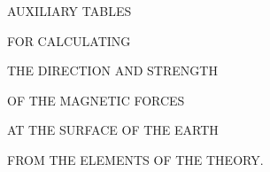\clearpage
\thispagestyle{empty}
\begin{center}
\vspace*{1in}
{\Large AUXILIARY TABLES\par}
\bigskip
FOR CALCULATING\par
\bigskip
{\large THE DIRECTION AND STRENGTH\par}
\bigskip
OF THE MAGNETIC FORCES\par
\bigskip
AT THE SURFACE OF THE EARTH\par
\bigskip
FROM THE ELEMENTS OF THE THEORY.\par
\end{center}
\clearpage
{}
\begingroup
\fontsize{9}{10.2}\selectfont
\setlength{\tabcolsep}{1.5pt}
\renewcommand{\arraystretch}{1.02}
